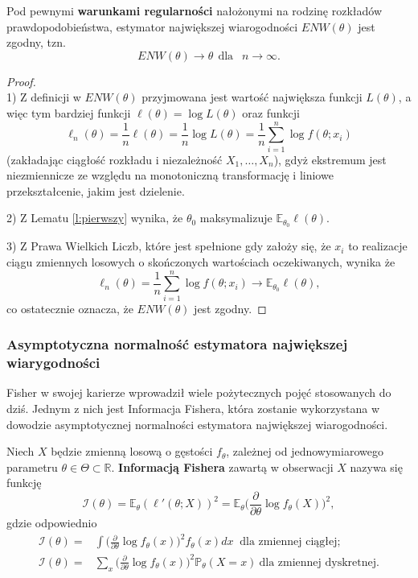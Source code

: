 \begin{theorem}\label{twierdzonko}
Pod pewnymi \textbf{warunkami regularności} nałożonymi na rodzinę rozkładów prawdopodobieństwa, estymator największej wiarogodności $ENW(\theta)$ jest zgodny, tzn. 
$$ENW(\theta) \rightarrow \theta \ \ \text{dla } \ \ n \rightarrow \infty.$$
\end{theorem}
\begin{proof}
\ \\
1) Z definicji w $ENW(\theta)$ przyjmowana jest wartość największa funkcji $L(\theta)$, a więc tym bardziej funkcji $ \ell(\theta) = \log L(\theta)$ oraz funkcji $$ \ell_n(\theta) = \frac{1}{n}\ell(\theta) = \frac{1}{n}\log L(\theta) = \frac{1}{n}\sum\limits_{i=1}^{n}\log f(\theta;x_i)$$ (zakładając ciągłość rozkładu i niezależność $X_1,\dots,X_n$), gdyż ekstremum jest niezmiennicze ze względu na monotoniczną transformację i liniowe przekształcenie, jakim jest dzielenie.

2) Z Lematu \ref{l:pierwszy} wynika, że $\theta_0$ maksymalizuje $\mathbb{E}_{\theta_0}\ell(\theta)$.

3) Z Prawa Wielkich Liczb, które jest spełnione gdy założy się, że $x_i$ to realizacje ciągu zmiennych losowych o skończonych wartościach oczekiwanych, wynika że $$ \ell_n(\theta) = \frac{1}{n}\sum\limits_{i=1}^{n}\log f(\theta;x_i) \rightarrow \mathbb{E}_{\theta_0}\ell(\theta),$$ co ostatecznie oznacza, że $ENW(\theta)$ jest zgodny.
\end{proof}

\newpage
\subsubsection{Asymptotyczna normalność estymatora największej wiarygodności}


Fisher w swojej karierze wprowadził wiele pożytecznych pojęć stosowanych do dziś. Jednym z nich jest Informacja Fishera, która zostanie wykorzystana w dowodzie asymptotycznej normalności estymatora największej wiarogodności.

\begin{definition}\label{inf:fish}
Niech $X$ będzie zmienną losową o gęstości $f_{\theta}$, zależnej od jednowymiarowego parametru $\theta \in \Theta \subset \mathbb{R}$. \textbf{Informacją Fishera} zawartą w obserwacji $X$ nazywa się funkcję
\begin{equation}\label{wzor:fish}
\mathcal{I}(\theta) = \mathbb{E}_{\theta}(\ell'(\theta;X))^2 = \mathbb{E}_{\theta}\Big(\frac{\partial}{\partial\theta}\log f_{\theta}(X) \Big)^2,
\end{equation}
gdzie odpowiednio
\begin{align*}
\mathcal{I}(\theta) = & \int \Big(\frac{\partial}{\partial\theta}\log f_{\theta}(x) \Big)^2 f_{\theta}(x)dx \ \text{\ \ \ \ \ dla zmiennej ciągłej;} \\
\mathcal{I}(\theta) = & \sum\limits_{x}^{ } \Big(\frac{\partial}{\partial\theta}\log f_{\theta}(x) \Big)^2 \mathbb{P}_{\theta}(X=x) \ \text{dla zmiennej dyskretnej}.
\end{align*}
\end{definition}

